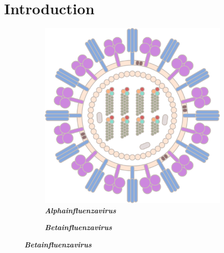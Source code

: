 \chapter{Introduction} \label{chap:Introduction}

\blindtext

\begin{figure}
    \centering
    \begin{adjustbox}{minipage=\dimexpr{}\fboxrule,fbox}
        \begin{subfigure}[b]{0.475\textwidth}
            \caption[\textit{Alphainfluenzavirus}]{\textbf{\textit{Alphainfluenzavirus}}}
            \label{subfig:Influenza_A}
            \includegraphics[width=\textwidth]{Graphics/Influenza_A.pdf}
        \end{subfigure}
        \hfill
        \begin{subfigure}[b]{0.475\textwidth}
            \caption[\textit{Betainfluenzavirus}]{\textbf{\textit{Betainfluenzavirus}}}
            \label{subfig:Influenza_B}

\end{subfigure}
\end{adjustbox}
\end{figure}

